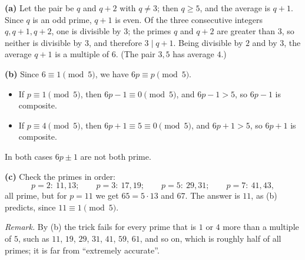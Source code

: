 \textbf{(a)} Let the pair be $q$ and $q+2$ with $q\ne3$; then $q\ge5$, and the average is $q+1$. Since $q$ is an odd prime, $q+1$ is even. Of the three consecutive integers $q,q+1,q+2$, one is divisible by $3$; the primes $q$ and $q+2$ are greater than $3$, so neither is divisible by $3$, and therefore $3\mid q+1$. Being divisible by $2$ and by $3$, the average $q+1$ is a multiple of $6$. (The pair $3,5$ has average $4$.)

\textbf{(b)} Since $6\equiv1\pmod5$, we have $6p\equiv p\pmod5$.
\begin{itemize}
\item If $p\equiv1\pmod5$, then $6p-1\equiv0\pmod5$, and $6p-1>5$, so $6p-1$ is composite.
\item If $p\equiv4\pmod5$, then $6p+1\equiv5\equiv0\pmod5$, and $6p+1>5$, so $6p+1$ is composite.
\end{itemize}
In both cases $6p\pm1$ are not both prime.

\textbf{(c)} Check the primes in order:
\[p=2:\ 11,13;\qquad p=3:\ 17,19;\qquad p=5:\ 29,31;\qquad p=7:\ 41,43,\]
all prime, but for $p=11$ we get $65=5\cdot13$ and $67$. The answer is $\boxed{11}$, as (b) predicts, since $11\equiv1\pmod5$.

\emph{Remark.} By (b) the trick fails for every prime that is $1$ or $4$ more than a multiple of $5$, such as $11$, $19$, $29$, $31$, $41$, $59$, $61$, and so on, which is roughly half of all primes; it is far from ``extremely accurate''.
